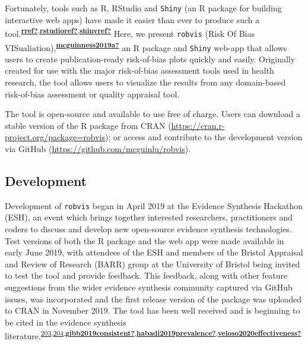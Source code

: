 \documentclass[a4paper, twoside]{templates/ociamthesis}
\begin{document}
Fortunately, tools such as R, RStudio and \texttt{Shiny} (an R package for building interactive web apps) have made it easier than ever to produce such a tool.\textsuperscript{\protect\hyperlink{ref-rref}{\textbf{rref?}},\protect\hyperlink{ref-rstudioref}{\textbf{rstudioref?}},\protect\hyperlink{ref-shinyref}{\textbf{shinyref?}}} Here, we present \texttt{robvis} (Risk Of Bias VISualiation),\textsuperscript{\protect\hyperlink{ref-mcguinness2019a}{\textbf{mcguinness2019a?}}} an R package and \texttt{Shiny} web-app that allows users to create publication-ready risk-of-bias plots quickly and easily. Originally created for use with the major risk-of-bias assessment tools used in health research, the tool allows users to visualize the results from any domain-based risk-of-bias assessment or quality appraisal tool.

The tool is open-source and available to use free of charge. Users can download a stable version of the R package from CRAN (\url{https://cran.r-project.org/package=robvis}); or access and contribute to the development version via GitHub (\url{https://github.com/mcguinlu/robvis}).

\hypertarget{development-1}{%
\subsection{Development}\label{development-1}}

Development of \texttt{robvis} began in April 2019 at the Evidence Synthesis Hackathon (ESH), an event which brings together interested researchers, practitioners and coders to discuss and develop new open-source evidence synthesis technologies. Test versions of both the R package and the web app were made available in early June 2019, with attendees of the ESH and members of the Bristol Appraisal and Review of Research (BARR) group at the University of Bristol being invited to test the tool and provide feedback. This feedback, along with other feature suggestions from the wider evidence synthesis community captured via GitHub issues, was incorporated and the first release version of the package was uploaded to CRAN in November 2019. The tool has been well received and is beginning to be cited in the evidence synthesis literature.\textsuperscript{\protect\hyperlink{ref-simillis2020}{203},\protect\hyperlink{ref-tanneru2020}{204},\protect\hyperlink{ref-gibb2019consistent}{\textbf{gibb2019consistent?}},\protect\hyperlink{ref-habadi2019prevalence}{\textbf{habadi2019prevalence?}},\protect\hyperlink{ref-veloso2020effectiveness}{\textbf{veloso2020effectiveness?}}}
\end{document}
